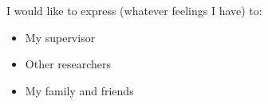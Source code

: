 
\cleardoublepage


\begin{acknowledgements}

I would like to express (whatever feelings I have) to:

\begin{itemize}
 \item My supervisor
 \vspace*{3mm}
 \item Other researchers
 \vspace*{3mm}
 \item My family and friends
\end{itemize}

\end{acknowledgements}
